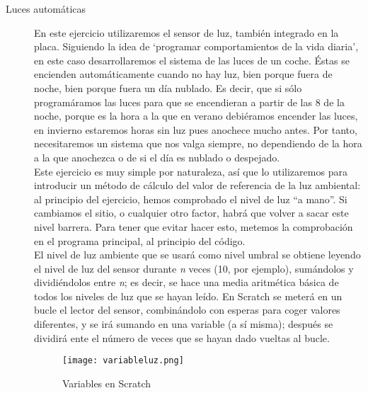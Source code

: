 \begin{description}
\item[Luces automáticas]\label{ej:lucesAuto}
En este ejercicio utilizaremos el sensor de luz, también integrado en la placa. Siguiendo la idea de `programar comportamientos de la vida diaria', en este caso desarrollaremos el sistema de las luces de un coche. Éstas se encienden automáticamente cuando no hay luz, bien porque fuera de noche, bien porque fuera un día nublado. Es decir, que si sólo programáramos las luces para que se encendieran a partir de las 8 de la noche, porque es la hora a la que en verano debiéramos encender las luces, en invierno estaremos horas sin luz pues anochece mucho antes. Por tanto, necesitaremos un sistema que nos valga siempre, no dependiendo de la hora a la que anochezca o de si el día es nublado o despejado. \\
Este ejercicio es muy simple por naturaleza, así que lo utilizaremos para introducir un método de cálculo del valor de referencia de la luz ambiental:
al principio del ejercicio, hemos comprobado el nivel de luz ``a mano''. Si cambiamos el sitio, o cualquier otro factor, habrá que volver a sacar este nivel barrera. Para tener que evitar hacer esto, metemos la comprobación en el programa principal, al principio del código. \\
El nivel de luz ambiente que se usará como nivel umbral se obtiene leyendo el nivel de luz del sensor durante \textit{n} veces (10, por ejemplo), sumándolos y dividiéndolos entre \textit{n}; es decir, se hace una media aritmética básica de todos los niveles de luz que se hayan leído. En Scratch se meterá en un bucle el lector del sensor, combinándolo con esperas para coger valores diferentes, y se irá sumando en una variable (a sí misma); después se dividirá ente el número de veces que se hayan dado vueltas al bucle. 

\begin{figure}[h]
	\centering
	\texttt{[image: variableluz.png]}	
	\caption{Variables en Scratch}
	\label{img:variableluz}
\end{figure}



\end{description}

